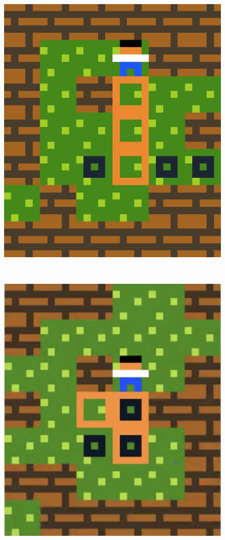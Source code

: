 \begin{figure}[!htbp]
\begin{minipage}[t]{0.2\textwidth}
\end{minipage}
$\:$
\begin{minipage}[t]{0.2\textwidth}
\includegraphics[width=\textwidth]{figures/finaldesign2_3.png} \hfill \\
\end{minipage}
$\:$
\begin{minipage}[t]{0.2\textwidth}
\includegraphics[width=\textwidth]{figures/finaldesign3_1.png} \hfill \\

\end{minipage}
\end{figure}

